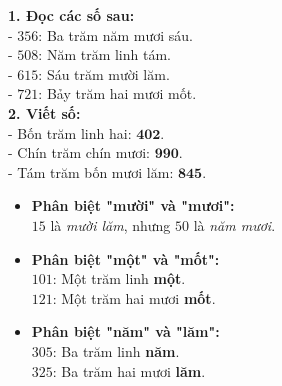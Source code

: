 \documentclass[10pt,a4paper]{article}
\begin{document}
\vspace{-1.5mm}
\noindent
\begin{minipage}[t]{0.49\textwidth}\vspace{0pt}
\begin{tcolorbox}[
  enhanced,
  colback=green!4!white,
  colframe=green!60!black,
  arc=2mm, boxrule=0.8pt,
  left=2mm, right=2mm, top=1.8mm, bottom=1.8mm,
  title={\footnotesize\bfseries\color{white}\faCheckCircle\ 4. Ví dụ mẫu chuẩn mực}
]
{\footnotesize
\textbf{1. Đọc các số sau:}\\
- $356$: Ba trăm năm mươi sáu.\\
- $508$: Năm trăm linh tám.\\
- $615$: Sáu trăm mười lăm.\\
- $721$: Bảy trăm hai mươi mốt.\\
\textbf{2. Viết số:}\\
- Bốn trăm linh hai: $\mathbf{402}$.\\
- Chín trăm chín mươi: $\mathbf{990}$.\\
- Tám trăm bốn mươi lăm: $\mathbf{845}$.
}
\end{tcolorbox}
\end{minipage}
\hfill
\begin{minipage}[t]{0.49\textwidth}\vspace{0pt}
\begin{tcolorbox}[
  enhanced,
  colback=rose!4!white,
  colframe=rose!70!black,
  arc=2mm, boxrule=0.8pt,
  left=2mm, right=2mm, top=1.8mm, bottom=1.8mm,
  title={\footnotesize\bfseries\color{white}\faExclamationTriangle\ 5. Cạm bẫy \& Lưu ý chính tả}
]
{\footnotesize
\begin{itemize}\setlength{\itemsep}{1.5pt}\setlength{\leftskip}{-2.5mm}
  \item \textbf{Phân biệt "mười" và "mươi":}\\
  $15$ là \textit{mười lăm}, nhưng $50$ là \textit{năm mươi}.
  \item \textbf{Phân biệt "một" và "mốt":}\\
  $101$: Một trăm linh \textbf{một}.\\
  $121$: Một trăm hai mươi \textbf{mốt}.
  \item \textbf{Phân biệt "năm" và "lăm":}\\
  $305$: Ba trăm linh \textbf{năm}.\\
  $325$: Ba trăm hai mươi \textbf{lăm}.
\end{itemize}
}
\end{tcolorbox}
\end{minipage}
\end{document}
